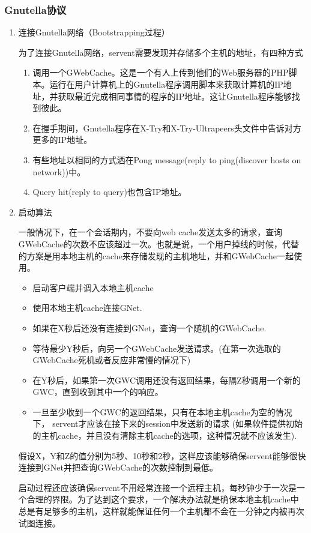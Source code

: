 \documentclass{ctexart}
\begin{document}
\subsubsection{Gnutella协议}
\begin{enumerate}
	\item 连接Gnutella网络（Bootstrapping过程）

	为了连接Gnutella网络，servent需要发现并存储多个主机的地址，有四种方式
	\begin{enumerate}
		\item 调用一个GWebCache。这是一个有人上传到他们的Web服务器的PHP脚本。运行在用户计算机上的Gnutella程序调用脚本来获取计算机的IP地址，并获取最近完成相同事情的程序的IP地址。这让Gnutella程序能够找到彼此。
		\item 在握手期间，Gnutella程序在X-Try和X-Try-Ultrapeers头文件中告诉对方更多的IP地址。
		\item 有些地址以相同的方式洒在Pong message(reply to ping(discover hosts on network))中。
		\item Query hit(reply to query)也包含IP地址。
	\end{enumerate}
	\item 启动算法

	一般情况下，在一个会话期内，不要向web cache发送太多的请求，查询GWebCache的次数不应该超过一次。也就是说，一个用户掉线的时候，代替的方案是用本地主机的cache来存储发现的主机地址，并和GWebCache一起使用。
	\begin{itemize}
		\item 启动客户端并调入本地主机cache
		\item 使用本地主机cache连接GNet.
		\item 如果在X秒后还没有连接到GNet，查询一个随机的GWebCache.
		\item 等待最少Y秒后，向另一个GWebCache发送请求。(在第一次选取的GWebCache死机或者反应非常慢的情况下)
		\item 在Y秒后，如果第一次GWC调用还没有返回结果，每隔Z秒调用一个新的GWC，直到收到其中一个的响应。
		\item 一旦至少收到一个GWC的返回结果，只有在本地主机cache为空的情况下，           servent才应该在接下来的session中发送新的请求 (如果软件提供初始的主机cache，并且没有清除主机cache的选项，这种情况就不应该发生).
	\end{itemize}
	假设X，Y和Z的值分别为5秒、10秒和2秒，这样应该能够确保servent能够很快连接到GNet并把查询GWebCache的次数控制到最低。

	启动过程还应该确保servent不用经常连接一个远程主机，每秒钟少于一次是一个合理的界限。为了达到这个要求，一个解决办法就是确保本地主机cache中总是有足够多的主机，这样就能保证任何一个主机都不会在一分钟之内被再次试图连接。


\end{enumerate}
\end{document}
